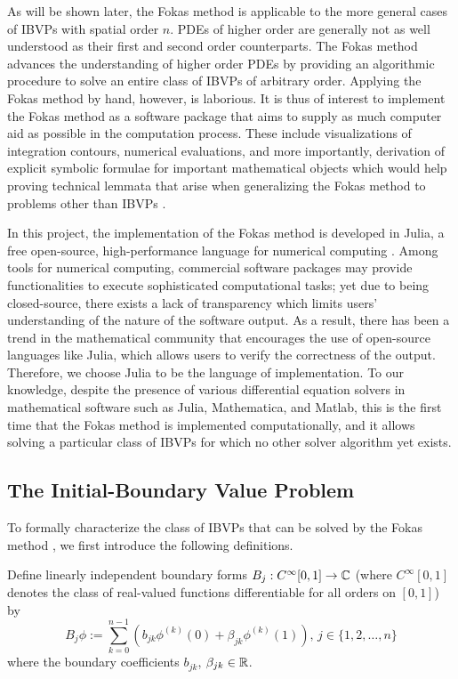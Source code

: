 \documentclass[11pt, oneside, a4paper]{article}
\begin{document}
As will be shown later, the Fokas method is applicable to the more general cases of IBVPs with spatial order $n$. PDEs of higher order are generally not as well understood as their first and second order counterparts. The Fokas method advances the understanding of higher order PDEs by providing an algorithmic procedure to solve an entire class of IBVPs of arbitrary order. Applying the Fokas method by hand, however, is laborious. It is thus of interest to implement the Fokas method as a software package that aims to supply as much computer aid as possible in the computation process. These include visualizations of integration contours, numerical evaluations, and more importantly, derivation of explicit symbolic formulae for important mathematical objects which would help proving technical lemmata that arise when generalizing the Fokas method to problems other than IBVPs \cite{Miller2018}.

In this project, the implementation of the Fokas method is developed in Julia, a free open-source, high-performance language for numerical computing \cite{julia}. Among tools for numerical computing, commercial software packages may provide functionalities to execute sophisticated computational tasks; yet due to being closed-source, there exists a lack of transparency which limits users' understanding of the nature of the software output. As a result, there has been a trend in the mathematical community that encourages the use of open-source languages like Julia, which allows users to verify the correctness of the output. Therefore, we choose Julia to be the language of implementation. To our knowledge, despite the presence of various differential equation solvers in mathematical software such as Julia, Mathematica, and Matlab, this is the first time that the Fokas method is implemented computationally, and it allows solving a particular class of IBVPs for which no other solver algorithm yet exists.

\subsection{The Initial-Boundary Value Problem}\label{sec:IBVP}
To formally characterize the class of IBVPs that can be solved by the Fokas method \cite[p.9]{Smith2016}, we first introduce the following definitions.

Define linearly independent boundary forms $B_j: C^\infty[0,1]\to \mathbb C$ (where $C^\infty[0,1]$ denotes the class of real-valued functions differentiable for all orders on $[0,1]$) by
\begin{equation}\label{eq:B_j}
    B_j\phi := \sum_{k=0}^{n-1}\left(b_{jk}\phi^{(k)}(0) + \beta_{jk}\phi^{(k)}(1)\right),\, j\in\{1,2,\ldots,n\}
\end{equation}
where the boundary coefficients $b_{jk}$, $\beta_{jk}\in\mathbb R$. 
\end{document}
